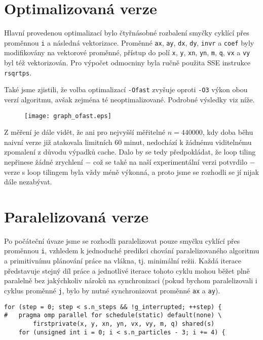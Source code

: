 \documentclass[10pt,a4paper]{article}
\begin{document}
\section{Optimalizovaná verze}

Hlavní provedenou optimalizací bylo čtyřnásobné rozbalení smyčky cyklící přes
proměnnou \texttt{i} a následná vektorizace. Proměnné \texttt{ax}, \texttt{ay},
\texttt{dx}, \texttt{dy}, \texttt{invr} a \texttt{coef} byly modifikovány na
vektorové proměnné, přístup do polí \texttt{x}, \texttt{y}, \texttt{xn},
\texttt{yn}, \texttt{m}, \texttt{q}, \texttt{vx} a \texttt{vy} byl též
vektorizován. Pro výpočet odmocniny byla ručně použita SSE instrukce
\texttt{rsqrtps}.

Také jsme zjistili, že volba optimalizací \texttt{-Ofast} zvyšuje oproti
\texttt{-O3} výkon obou verzí algoritmu, avšak zejména té neoptimalizované.
Podrobné výsledky viz níže.

\begin{figure}[h]
    \centering
    \texttt{[image: graph\_ofast.eps]}
    \label{fig:1}
\end{figure}

Z měření je dále vidět, že ani pro nejvyšší měřitelné $ n = 440000 $, kdy doba
běhu naivní verze již atakovala limitních 60 minut, nedochází k žádnému
viditelnému zpomalení z důvodu výpadků cache. Dalo by se tedy předpokládat,
že loop tiling nepřinese žádné zrychlení $ - $ což se také na naší
experimentální verzi potvrdilo $ - $ verze s loop tilingem byla vždy méně
výkonná, a proto jsme se rozhodli se jí nijak dále nezabývat.

\section{Paralelizovaná verze}

Po počáteční úvaze jsme se rozhodli paralelizovat pouze smyčku cyklící
přes proměnnou \texttt{i}, vzhledem k jednoduché predikci chování
paralelizovaného algoritmu a primitivnímu plánování práce na vlákna, tj.
minimální režii. Každá iterace představuje stejný díl práce a jednotlivé
iterace tohoto cyklu mohou běžet plně paralelně bez jakýchkoliv nároků na
synchronizaci (pokud bychom paralelizovali i cyklus proměnné \texttt{j},
bylo by nutné synchronizovat proměnné \texttt{ax} a \texttt{ay}).

\begin{lstlisting}
for (step = 0; step < s.n_steps && !g_interrupted; ++step) {
#   pragma omp parallel for schedule(static) default(none) \
        firstprivate(x, y, xn, yn, vx, vy, m, q) shared(s)
    for (unsigned int i = 0; i < s.n_particles - 3; i += 4) {
\end{lstlisting}
\end{document}
